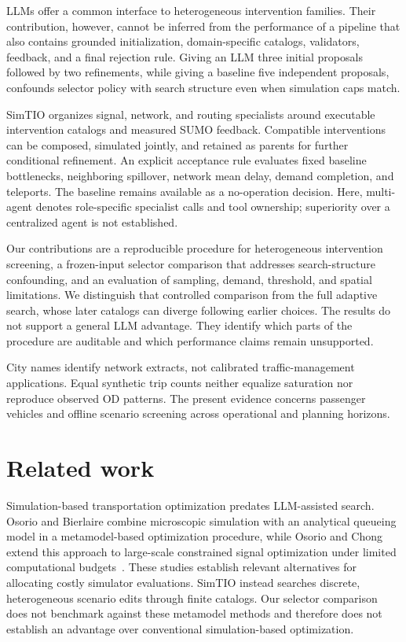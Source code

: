 \documentclass[11pt]{article}
\begin{document}
LLMs offer a common interface to heterogeneous intervention families. Their contribution, however, cannot be inferred from the performance of a pipeline that also contains grounded initialization, domain-specific catalogs, validators, feedback, and a final rejection rule. Giving an LLM three initial proposals followed by two refinements, while giving a baseline five independent proposals, confounds selector policy with search structure even when simulation caps match.

SimTIO organizes signal, network, and routing specialists around executable intervention catalogs and measured SUMO feedback. Compatible interventions can be composed, simulated jointly, and retained as parents for further conditional refinement. An explicit acceptance rule evaluates fixed baseline bottlenecks, neighboring spillover, network mean delay, demand completion, and teleports. The baseline remains available as a no-operation decision. Here, multi-agent denotes role-specific specialist calls and tool ownership; superiority over a centralized agent is not established.

Our contributions are a reproducible procedure for heterogeneous intervention screening, a frozen-input selector comparison that addresses search-structure confounding, and an evaluation of sampling, demand, threshold, and spatial limitations. We distinguish that controlled comparison from the full adaptive search, whose later catalogs can diverge following earlier choices. The results do not support a general LLM advantage. They identify which parts of the procedure are auditable and which performance claims remain unsupported.

City names identify network extracts, not calibrated traffic-management applications. Equal synthetic trip counts neither equalize saturation nor reproduce observed OD patterns. The present evidence concerns passenger vehicles and offline scenario screening across operational and planning horizons.

\section{Related work}
Simulation-based transportation optimization predates LLM-assisted search. Osorio and Bierlaire combine microscopic simulation with an analytical queueing model in a metamodel-based optimization procedure, while Osorio and Chong extend this approach to large-scale constrained signal optimization under limited computational budgets~\cite{osorio2013simulation,osorio2015large}. These studies establish relevant alternatives for allocating costly simulator evaluations. SimTIO instead searches discrete, heterogeneous scenario edits through finite catalogs. Our selector comparison does not benchmark against these metamodel methods and therefore does not establish an advantage over conventional simulation-based optimization.
\end{document}
